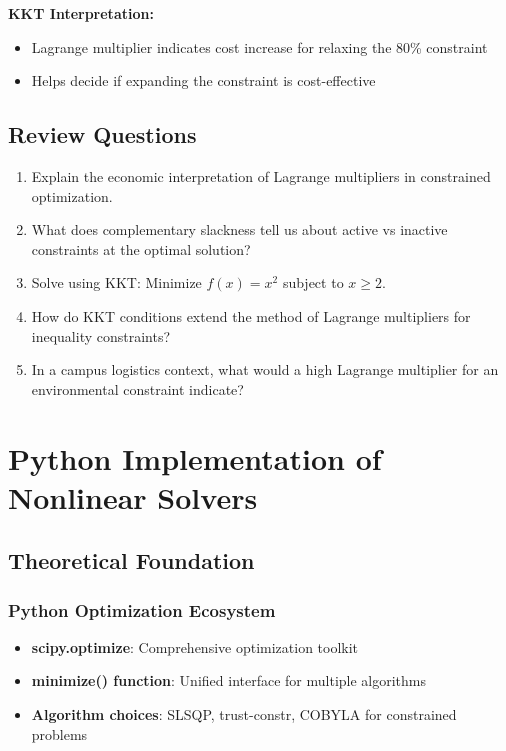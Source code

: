 \documentclass[
  letterpaper,
  DIV=11,
  numbers=noendperiod]{scrreprt}
\providecommand{\tightlist}{%
  \setlength{\itemsep}{0pt}\setlength{\parskip}{0pt}}
\begin{document}
\textbf{KKT Interpretation:}

\begin{itemize}
\tightlist
\item
  Lagrange multiplier indicates cost increase for relaxing the 80\%
  constraint
\item
  Helps decide if expanding the constraint is cost-effective
\end{itemize}

\subsection{Review Questions}\label{review-questions-4}

\begin{enumerate}
\def\labelenumi{\arabic{enumi}.}
\item
  Explain the economic interpretation of Lagrange multipliers in
  constrained optimization.
\item
  What does complementary slackness tell us about active vs inactive
  constraints at the optimal solution?
\item
  Solve using KKT: Minimize \(f(x) = x^2\) subject to \(x \geq 2\).
\item
  How do KKT conditions extend the method of Lagrange multipliers for
  inequality constraints?
\item
  In a campus logistics context, what would a high Lagrange multiplier
  for an environmental constraint indicate?
\end{enumerate}

\section{Python Implementation of Nonlinear
Solvers}\label{python-implementation-of-nonlinear-solvers}

\subsection{Theoretical Foundation}\label{theoretical-foundation-3}

\subsubsection{Python Optimization
Ecosystem}\label{python-optimization-ecosystem}

\begin{itemize}
\tightlist
\item
  \textbf{scipy.optimize}: Comprehensive optimization toolkit
\item
  \textbf{minimize() function}: Unified interface for multiple
  algorithms
\item
  \textbf{Algorithm choices}: SLSQP, trust-constr, COBYLA for
  constrained problems
\end{itemize}
\end{document}

